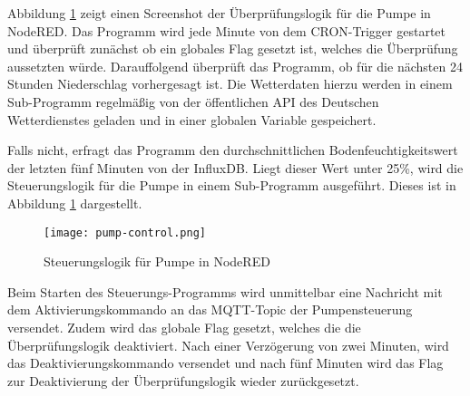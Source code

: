 Abbildung \ref{fig:pump-activation} zeigt einen Screenshot der Überprüfungslogik für die Pumpe in NodeRED.
Das Programm wird jede Minute von dem CRON-Trigger gestartet und überprüft zunächst ob ein globales Flag gesetzt ist, welches die Überprüfung aussetzten würde.
Darauffolgend überprüft das Programm, ob für die nächsten 24 Stunden Niederschlag vorhergesagt ist.
Die Wetterdaten hierzu werden in einem Sub-Programm regelmäßig von der öffentlichen API des Deutschen Wetterdienstes geladen und in einer globalen Variable gespeichert.

Falls nicht, erfragt das Programm den durchschnittlichen Bodenfeuchtigkeitswert der letzten fünf Minuten von der InfluxDB.
Liegt dieser Wert unter 25\%, wird die Steuerungslogik für die Pumpe in einem Sub-Programm ausgeführt.
Dieses ist in Abbildung \ref{fig:pump-activation} dargestellt.

\begin{figure}[h]
  \centering
  \texttt{[image: pump-control.png]}
  \caption{Steuerungslogik für Pumpe in NodeRED}\label{fig:pump-activation}
\end{figure}

Beim Starten des Steuerungs-Programms wird unmittelbar eine Nachricht mit dem Aktivierungskommando an das MQTT-Topic der Pumpensteuerung versendet.
Zudem wird das globale Flag gesetzt, welches die die Überprüfungslogik deaktiviert.
Nach einer Verzögerung von zwei Minuten, wird das Deaktivierungskommando versendet und nach fünf Minuten wird das Flag zur Deaktivierung der Überprüfungslogik wieder zurückgesetzt.